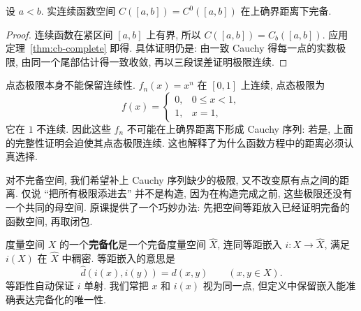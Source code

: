 \begin{corollary}\label{cor:c-interval-complete}
设 $a<b$. 实连续函数空间 $C([a,b])=C^0([a,b])$ 在上确界距离下完备.
\end{corollary}
\begin{proof}
连续函数在紧区间 $[a,b]$ 上有界, 所以
$C([a,b])=C_b([a,b])$. 应用定理~\ref{thm:cb-complete} 即得. 具体证明仍是: 由一致 Cauchy 得每一点的实数极限, 由同一个尾部估计得一致收敛, 再以三段误差证明极限连续.
\end{proof}

\begin{remark}
点态极限本身不能保留连续性. $f_n(x)=x^n$ 在 $[0,1]$ 上连续, 点态极限为
\[
f(x)=\begin{cases}0,&0\leq x<1,\\1,&x=1,\end{cases}
\]
它在 $1$ 不连续. 因此这些 $f_n$ 不可能在上确界距离下形成 Cauchy 序列: 若是, 上面的完整性证明会迫使其点态极限连续. 这也解释了为什么函数方程中的距离必须认真选择.
\end{remark}


对不完备空间, 我们希望补上 Cauchy 序列缺少的极限, 又不改变原有点之间的距离. 仅说 ``把所有极限添进去'' 并不是构造, 因为在构造完成之前, 这些极限还没有一个共同的母空间. 原课提供了一个巧妙办法: 先把空间等距放入已经证明完备的函数空间, 再取闭包.

\begin{definition}\label{def:completion}
度量空间 $X$ 的一个\textbf{完备化}是一个完备度量空间 $\widehat X$, 连同等距嵌入 $i:X\to\widehat X$, 满足 $i(X)$ 在 $\widehat X$ 中稠密. 等距嵌入的意思是
\[
\widehat d(i(x),i(y))=d(x,y)\qquad(x,y\in X).
\]
等距性自动保证 $i$ 单射. 我们常把 $x$ 和 $i(x)$ 视为同一点, 但定义中保留嵌入能准确表达完备化的唯一性.
\end{definition}

